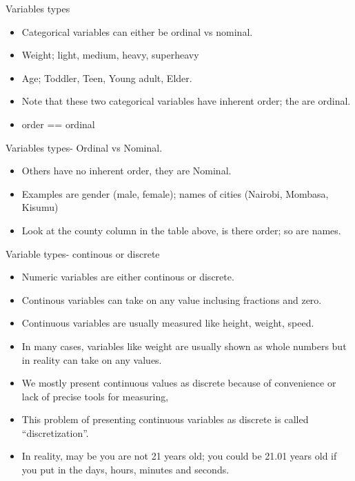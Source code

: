 \documentclass[
  ignorenonframetext,
]{beamer}
\begin{document}
\begin{frame}{Variables types}
\protect\hypertarget{variables-types}{}
\begin{itemize}
\item
  Categorical variables can either be ordinal vs nominal.
\item
  Weight; light, medium, heavy, superheavy
\item
  Age; Toddler, Teen, Young adult, Elder.
\item
  Note that these two categorical variables have inherent order; the are
  ordinal.
\item
  order == ordinal
\end{itemize}
\end{frame}

\begin{frame}{Variables types- Ordinal vs Nominal.}
\protect\hypertarget{variables-types--ordinal-vs-nominal.}{}
\begin{itemize}
\item
  Others have no inherent order, they are Nominal.
\item
  Examples are gender (male, female); names of cities (Nairobi, Mombasa,
  Kisumu)
\item
  Look at the county column in the table above, is there order; so are
  names.
\end{itemize}
\end{frame}

\begin{frame}{Variable types- continous or discrete}
\protect\hypertarget{variable-types--continous-or-discrete}{}
\begin{itemize}
\item
  Numeric variables are either continous or discrete.
\item
  Continous variables can take on any value inclusing fractions and
  zero.
\item
  Continuous variables are usually measured like height, weight, speed.
\item
  In many cases, variables like weight are usually shown as whole
  numbers but in reality can take on any values.
\item
  We mostly present continuous values as discrete because of convenience
  or lack of precise tools for measuring,
\item
  This problem of presenting continuous variables as discrete is called
  ``discretization''.
\item
  In reality, may be you are not 21 years old; you could be 21.01 years
  old if you put in the days, hours, minutes and seconds.
\end{itemize}
\end{frame}
\end{document}
